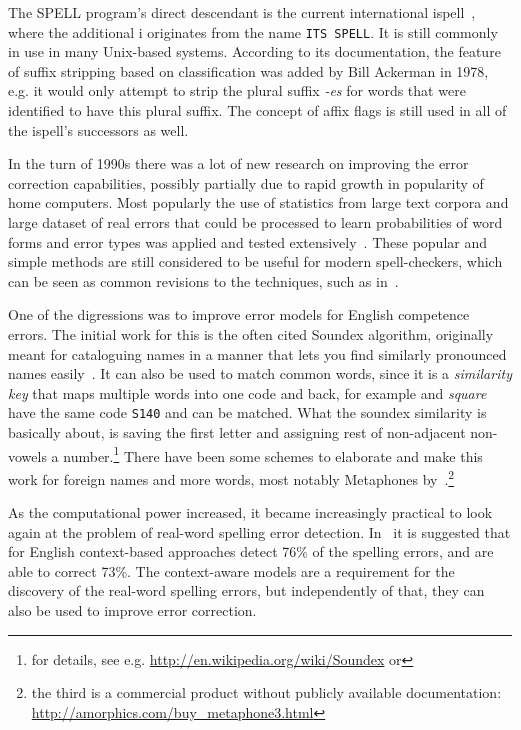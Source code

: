 \documentclass[officiallayout]{unihelcompling}
\newcommand\misspelt{\bgroup\markoverwith
{\textcolor{red}{\lower3.5pt\hbox{\sixly \char58}}}\ULon}
\begin{document}
The SPELL program's direct descendant is the current international
ispell~\citep{gorin1971spell}, where the additional i originates from the name
\texttt{ITS SPELL}. It is still commonly in use in many Unix-based systems.
According to its documentation, the feature of suffix stripping based on
classification was added by Bill Ackerman in 1978, e.g. it would only attempt
to strip the plural suffix \emph{-es} for words that were identified to have
this plural suffix.  The concept of affix flags is still used in all of the
ispell's successors as well.

In the turn of 1990s there was a lot of new research on improving the error
correction capabilities, possibly partially due to rapid growth in popularity
of home computers. Most popularly the use of statistics from large text corpora
and large dataset of real errors that could be processed to learn probabilities
of word forms and error types was applied and tested
extensively~\citep{kernighan1990spelling,church1991probability}. These popular
and simple methods are still considered to be useful for modern spell-checkers,
which can be seen as common revisions to the techniques, such as
in~\citet{brill2000improved}.

One of the digressions was to improve error models for English competence
errors. The initial work for this is the often cited Soundex algorithm,
originally meant for cataloguing names in a manner that lets you find similarly
pronounced names easily~\citep{russell1918soundex}. It can also be used to
match common words, since it is a \emph{similarity key} that maps multiple
words into one code and back, for example \misspelt{squer} and \emph{square}
have the same code \texttt{S140} and can be matched.
What the soundex similarity
is basically about, is saving the first letter and assigning rest of
non-adjacent non-vowels a number.\footnote{for details, see e.g. \url{http://en.wikipedia.org/wiki/Soundex} or } There have been some schemes to elaborate and
make this work for foreign names and more words, most notably Metaphones
by~\citet{philips1990hanging,philips2000double}.\footnote{the third is a
commercial product without publicly available documentation:
\url{http://amorphics.com/buy_metaphone3.html}}

As the computational power increased, it became increasingly practical to look
again at the problem of real-word spelling error detection.
In~\citet{mays1991context} it is suggested that for English context-based
approaches detect 76\% of the spelling errors, and are able to correct 73\%.
The context-aware models are a requirement for the discovery of the real-word
spelling errors, but independently of that, they can also be used to improve
error correction. 
\end{document}
